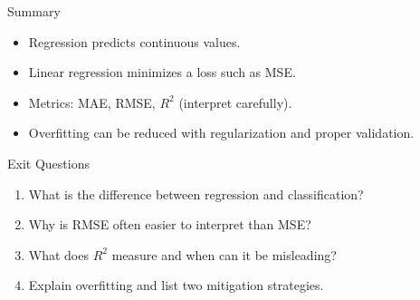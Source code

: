 \documentclass[aspectratio=169]{beamer}
\begin{document}
\begin{frame}{Summary}
  \begin{itemize}
    \item Regression predicts continuous values.
    \item Linear regression minimizes a loss such as MSE.
    \item Metrics: MAE, RMSE, $R^2$ (interpret carefully).
    \item Overfitting can be reduced with regularization and proper validation.
  \end{itemize}
  \slidesources{\AIMLUnitIVSources}
\end{frame}

\begin{frame}{Exit Questions}
  \begin{enumerate}
    \item What is the difference between regression and classification?
    \item Why is RMSE often easier to interpret than MSE?
    \item What does $R^2$ measure and when can it be misleading?
    \item Explain overfitting and list two mitigation strategies.
  \end{enumerate}
\end{frame}
\end{document}
